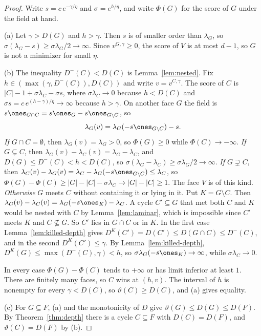 \begin{proof}
Write $s=c\,e^{-\gamma/\eta}$ and $\sigma=e^{h/\eta}$, and write $\Phi(G)$ for the
score of $G$ under the field at hand.

(a) Let $\gamma>D(G)$ and $h>\gamma$. Then $s$ is of smaller order than
$\lambda_G$, so $\sigma(\lambda_G-s)\ge\sigma\lambda_G/2\to\infty$. Since
$v^{G,\gamma}\ge0$, the score of $V$ is at most $d-1$, so $G$ is not a
minimizer for small $\eta$.

(b) The inequality $D^-(C)<D(C)$ is Lemma~\ref{lem:nested}. Fix
$h\in(\max(\gamma,D^-(C)),D(C))$ and write $v=v^{C,\gamma}$. The score of $C$ is
$|C|-1+\sigma\lambda_C-\sigma s$, where $\sigma\lambda_C\to0$ because $h<D(C)$ and
$\sigma s=c\,e^{(h-\gamma)/\eta}\to\infty$ because $h>\gamma$. On another face
$G$ the field is $s\ones_{G\cap C}=s\ones_G-s\ones_{G\setminus C}$, so
\[
 \lambda_G(v)=\lambda_G(-s\ones_{G\setminus C})-s .
\]
\emph{If $G\cap C=\emptyset$}, then $\lambda_G(v)=\lambda_G>0$, so $\Phi(G)\ge0$
while $\Phi(C)\to-\infty$.
\emph{If $G\subsetneq C$}, then $\lambda_G(v)-\lambda_C(v)=\lambda_G-\lambda_C$, and
$D(G)\le D^-(C)<h<D(C)$, so $\sigma(\lambda_G-\lambda_C)\ge\sigma\lambda_G/2\to\infty$.
\emph{If $G\supsetneq C$}, then
$\lambda_C(v)-\lambda_G(v)=\lambda_C-\lambda_G(-s\ones_{G\setminus C})\le\lambda_C$, so
$\Phi(G)-\Phi(C)\ge|G|-|C|-\sigma\lambda_C\to|G|-|C|\ge1$. The face $V$ is of this
kind.
\emph{Otherwise} $G$ meets $C$ without containing it or lying in it. Put
$K=G\setminus C$. Then $\lambda_G(v)-\lambda_C(v)=\lambda_G(-s\ones_K)-\lambda_C$. A
cycle $C'\subseteq G$ that met both $C$ and $K$ would be nested with $C$ by
Lemma~\ref{lem:laminar}, which is impossible since $C'$ meets $K$ and
$C\not\subseteq G$. So $C'$ lies in $G\cap C$ or in $K$. In the first case
Lemma~\ref{lem:killed-depth} gives $D^K(C')=D(C')\le D(G\cap C)\le D^-(C)$, and in
the second $D^K(C')\le\gamma$. By Lemma~\ref{lem:killed-depth},
$D^K(G)\le\max(D^-(C),\gamma)<h$, so $\sigma\lambda_G(-s\ones_K)\to\infty$, while
$\sigma\lambda_C\to0$.

In every case $\Phi(G)-\Phi(C)$ tends to $+\infty$ or has limit inferior at
least $1$. There are finitely many faces, so $C$ wins at $(h,v)$. The interval
of $h$ is nonempty for every $\gamma<D(C)$, so $\vartheta(C)\ge D(C)$, and (a) gives
equality.

(c) For $G\subseteq F$, (a) and the monotonicity of $D$ give
$\vartheta(G)\le D(G)\le D(F)$. By Theorem~\ref{thm:depth} there is a cycle
$C\subseteq F$ with $D(C)=D(F)$, and $\vartheta(C)=D(F)$ by (b).
\end{proof}

